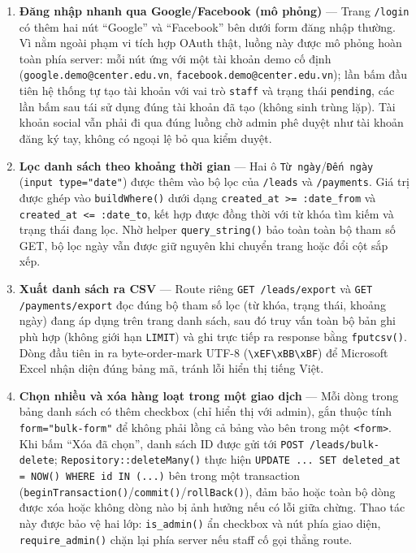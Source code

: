 \begin{enumerate}[label = \textbf{\arabic*.}, leftmargin = 0.5cm]

    \item \textbf{Đăng nhập nhanh qua Google/Facebook (mô phỏng)} — Trang \texttt{/login} có thêm hai nút ``Google'' và ``Facebook'' bên dưới form đăng nhập thường. Vì nằm ngoài phạm vi tích hợp OAuth thật, luồng này được mô phỏng hoàn toàn phía server: mỗi nút ứng với một tài khoản demo cố định (\texttt{google.demo@center.edu.vn}, \texttt{facebook.demo@center.edu.vn}); lần bấm đầu tiên hệ thống tự tạo tài khoản với vai trò \texttt{staff} và trạng thái \texttt{pending}, các lần bấm sau tái sử dụng đúng tài khoản đã tạo (không sinh trùng lặp). Tài khoản social vẫn phải đi qua đúng luồng chờ admin phê duyệt như tài khoản đăng ký tay, không có ngoại lệ bỏ qua kiểm duyệt.

    \item \textbf{Lọc danh sách theo khoảng thời gian} — Hai ô \texttt{Từ ngày}/\texttt{Đến ngày} (\texttt{input type="date"}) được thêm vào bộ lọc của \texttt{/leads} và \texttt{/payments}. Giá trị được ghép vào \texttt{buildWhere()} dưới dạng \texttt{created\_at >= :date\_from} và \texttt{created\_at <= :date\_to}, kết hợp được đồng thời với từ khóa tìm kiếm và trạng thái đang lọc. Nhờ helper \texttt{query\_string()} bảo toàn toàn bộ tham số GET, bộ lọc ngày vẫn được giữ nguyên khi chuyển trang hoặc đổi cột sắp xếp.

    \item \textbf{Xuất danh sách ra CSV} — Route riêng \texttt{GET /leads/export} và \texttt{GET /payments/export} đọc đúng bộ tham số lọc (từ khóa, trạng thái, khoảng ngày) đang áp dụng trên trang danh sách, sau đó truy vấn toàn bộ bản ghi phù hợp (không giới hạn \texttt{LIMIT}) và ghi trực tiếp ra response bằng \texttt{fputcsv()}. Dòng đầu tiên in ra byte-order-mark UTF-8 (\texttt{\textbackslash xEF\textbackslash xBB\textbackslash xBF}) để Microsoft Excel nhận diện đúng bảng mã, tránh lỗi hiển thị tiếng Việt.

    \item \textbf{Chọn nhiều và xóa hàng loạt trong một giao dịch} — Mỗi dòng trong bảng danh sách có thêm checkbox (chỉ hiển thị với admin), gắn thuộc tính \texttt{form="bulk-form"} để không phải lồng cả bảng vào bên trong một \texttt{<form>}. Khi bấm ``Xóa đã chọn'', danh sách ID được gửi tới \texttt{POST /leads/bulk-delete}; \texttt{Repository::deleteMany()} thực hiện \texttt{UPDATE ... SET deleted\_at = NOW() WHERE id IN (...)} bên trong một transaction (\texttt{beginTransaction()}/\texttt{commit()}/\texttt{rollBack()}), đảm bảo hoặc toàn bộ dòng được xóa hoặc không dòng nào bị ảnh hưởng nếu có lỗi giữa chừng. Thao tác này được bảo vệ hai lớp: \texttt{is\_admin()} ẩn checkbox và nút phía giao diện, \texttt{require\_admin()} chặn lại phía server nếu staff cố gọi thẳng route.


\end{enumerate}
